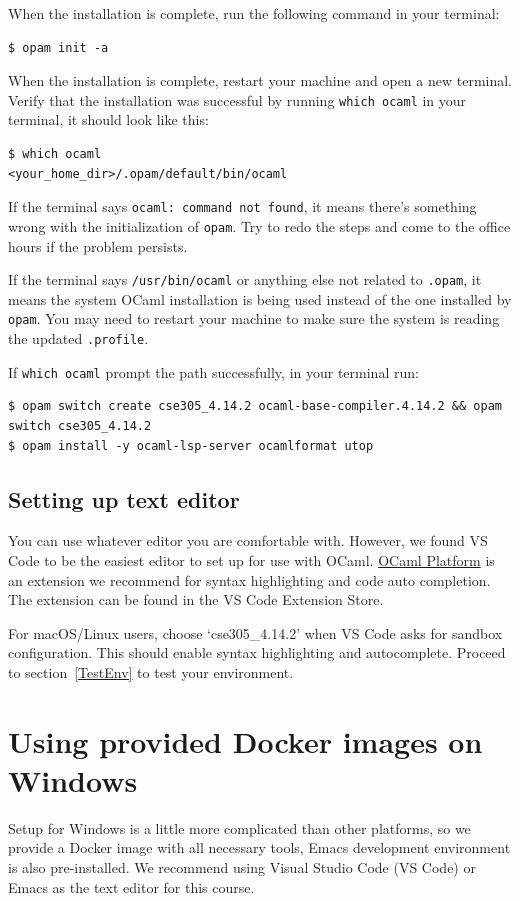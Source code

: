 \documentclass{extarticle}
\begin{document}
When the installation is complete, run the following command in your terminal:
\begin{lstlisting}
$ opam init -a
\end{lstlisting}

When the installation is complete, restart your machine and open a new terminal.
Verify that the installation was successful by running \texttt{which ocaml} in your terminal,
it should look like this:
\begin{lstlisting}
$ which ocaml
<your_home_dir>/.opam/default/bin/ocaml
\end{lstlisting}

If the terminal says \texttt{ocaml: command not found},
it means there's something wrong with the initialization of \texttt{opam}.
Try to redo the steps and come to the office hours if the problem persists.

If the terminal says \texttt{/usr/bin/ocaml} or anything else not related to \texttt{.opam},
it means the system OCaml installation is being used instead of the one installed by \texttt{opam}.
You may need to restart your machine to make sure the system is reading the updated \texttt{.profile}.

If \texttt{which ocaml} prompt the path successfully, in your terminal run:
\begin{lstlisting}
$ opam switch create cse305_4.14.2 ocaml-base-compiler.4.14.2 && opam switch cse305_4.14.2
$ opam install -y ocaml-lsp-server ocamlformat utop
\end{lstlisting}

\subsection{Setting up text editor}
You can use whatever editor you are comfortable with.
However, we found VS Code to be the easiest editor to set up for use with OCaml.
\href{https://marketplace.visualstudio.com/items?itemName=ocamllabs.ocaml-platform}{OCaml Platform} is an extension we recommend for syntax highlighting and code auto completion.
The extension can be found in the VS Code Extension Store.

For macOS/Linux users, choose `cse305\_4.14.2' when VS Code asks for sandbox configuration.
This should enable syntax highlighting and autocomplete. Proceed to section~\ref{TestEnv} to test
your environment.


\newpage
\section{Using provided Docker images on Windows}\label{DockerSetup}
Setup for Windows is a little more complicated than other platforms,
so we provide a Docker image with all necessary tools,
Emacs development environment is also pre-installed.
We recommend using Visual Studio Code (VS Code) or Emacs as the text editor for this course.
\end{document}
